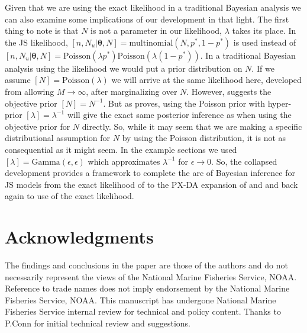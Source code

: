 \documentclass[11pt]{article}
\newcommand{\bt}{\ensuremath{\boldsymbol{\theta}}}
\begin{document}
Given that we are using the exact likelihood in a traditional Bayesian analysis we can also examine some implications of our development in that light. The first thing to note is that $N$ is not a parameter in our likelihood, $\lambda$ takes its place. In the \cite{schwarz1996general} JS likelihood, $[n,N_u|\bt, N] = \text{multinomial}(N,p^*,1-p^*)$ is used instead of $[n,N_u|\bt, N]=\text{Poisson}(\lambda p^*)\text{Poisson}(\lambda (1-p^*))$. In a traditional Bayesian analysis using the likelihood we would put a prior distribution on $N$. If we assume $[N] = \text{Poisson}(\lambda)$ we will arrive at the same likelihood here, developed from allowing $M \to \infty$, after marginalizing over $N$. However, \cite{link2013cautionary} suggests the objective prior $[N]=N^{-1}$. But as \cite{schofield2023estimating} proves, using the Poisson prior with hyper-prior $[\lambda]=\lambda^{-1}$ will give the exact same posterior inference as when using the objective prior for $N$ directly. So, while it may seem that we are making a specific distributional assumption for $N$ by using the Poisson distribution, it is not as consequential as it might seem. In the example sections we used $[\lambda] = \text{Gamma}(\epsilon, \epsilon)$ which approximates $\lambda^{-1}$ for $\epsilon \to 0$. So, the collapsed development provides a framework to complete the arc of Bayesian inference for JS models from the exact likelihood of \cite{schwarz1996general} to the PX-DA expansion of \cite{Durban:2005yw} and \cite{Royle:2007kx} and back again to use of the exact likelihood. 



\section*{Acknowledgments}
The findings and conclusions in the paper are those of the authors and do not necessarily represent the views of the National Marine Fisheries Service, NOAA. Reference to trade names does not imply endorsement by the National Marine Fisheries Service, NOAA. This manuscript has undergone National Marine Fisheries Service internal review for technical and policy content. Thanks to P.Conn for initial technical review and suggestions. 

%



\end{document}
